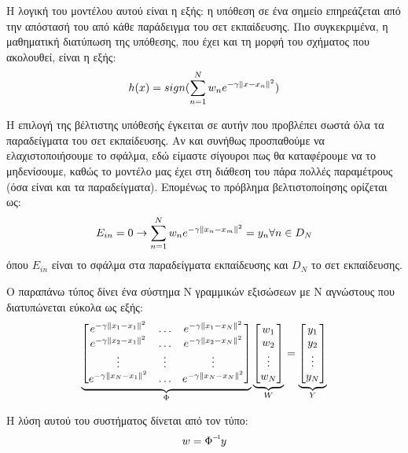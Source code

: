 Η λογική του  μοντέλου αυτού είναι η εξής: η υπόθεση σε ένα σημείο επηρεάζεται από την απόστασή του από κάθε παράδειγμα του σετ εκπαίδευσης. Πιο συγκεκριμένα, η μαθηματική διατύπωση της υπόθεσης, που έχει και τη μορφή του σχήματος που ακολουθεί, είναι η εξής:
\begin{equation}
h(x)= sign( \sum_{n=1}^{N} w_n e^{-\gamma \left\lVert x - x_n\right\rVert^2})
\end{equation}

Η επιλογή της βέλτιστης υπόθεσής έγκειται σε αυτήν που προβλέπει σωστά όλα τα παραδείγματα του σετ εκπαίδευσης. Αν και συνήθως προσπαθούμε να ελαχιστοποιήσουμε το σφάλμα, εδώ είμαστε σίγουροι πως θα καταφέρουμε να το μηδενίσουμε, καθώς το μοντέλο μας έχει στη διάθεση του πάρα πολλές παραμέτρους (όσα είναι και τα παραδείγματα). Επομένως το πρόβλημα βελτιστοποίησης ορίζεται ως:
\begin{equation}
E_{in}=0 \rightarrow  \sum_{n=1}^{N} w_n e^{-\gamma \left\lVert x_n - x_m\right\rVert^2}= y_n  \forall n \in D_N 
\end{equation}
όπου $E_{in}$ είναι το σφάλμα στα παραδείγματα εκπαίδευσης και $D_N$ το σετ εκπαίδευσης. 

Ο παραπάνω τύπος δίνει ένα σύστημα Ν γραμμικών εξισώσεων με Ν αγνώστους που διατυπώνεται εύκολα ως εξής:
\[
\underbrace{
	\begin{bmatrix}
	e^{-\gamma \left\lVert x_1 - x_1\right\rVert^2}  & \dots  &  e^{-\gamma \left\lVert x_1 - x_N\right\rVert^2} \\
	e^{-\gamma \left\lVert x_2 - x_1\right\rVert^2}  & \dots  &  e^{-\gamma \left\lVert x_2 - x_N\right\rVert^2} \\
	\vdots  & \vdots & \vdots \\
	e^{-\gamma \left\lVert x_N - x_1\right\rVert^2}  & \dots  &  e^{-\gamma \left\lVert x_N - x_N\right\rVert^2} \\
	\end{bmatrix}}_{  \Phi}
\underbrace{
	\begin{bmatrix}
	w_{1}       \\
	w_{2}        \\
	\vdots        \\
	w_{N}
	\end{bmatrix}}_{W}
=
\underbrace{
	\begin{bmatrix}
	y_{1}       \\
	y_{2}        \\
	\vdots        \\
	y_{N}
	\end{bmatrix}}_{Y}
\]

Η λύση αυτού του συστήματος δίνεται από τον τύπο:
\begin{equation}
w=\inv{\Phi} y
\end{equation}


